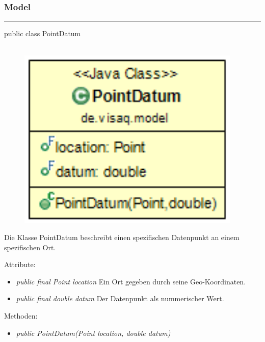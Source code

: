 \subsubsection{Model}
\newpage



\rule{\textwidth}{0.4pt}
public class PointDatum
\\\\
\begin{minipage}{0.4\textwidth}
    \begin{figure}[H]
        {\centering\includegraphics[width=0.95\textwidth]{media/backend/modell/classes/PointDatum.png}}
    \end{figure}
    \end{minipage} \hfill
\begin{minipage}{0.6\textwidth}
    Die Klasse PointDatum beschreibt einen spezifischen Datenpunkt an einem spezifischen Ort.
\end{minipage}

Attribute:
\begin{itemize}
    \item \emph{public final Point location} Ein Ort gegeben durch seine Geo-Koordinaten.
    \item \emph{public final double datum} Der Datenpunkt als nummerischer Wert.
\end{itemize}
Methoden:
\begin{itemize}
    \item \emph{public PointDatum(Point location, double datum)}
\end{itemize}

